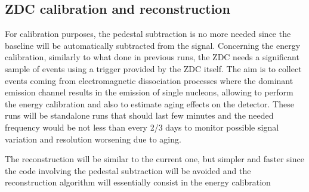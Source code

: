 \subsection{ZDC calibration and reconstruction}
\label{ZDC:FLP}

For calibration purposes, the pedestal subtraction is no more needed since 
the baseline will be automatically subtracted from the signal. 
Concerning the energy calibration, similarly to what done in previous runs, 
the ZDC needs a significant sample of events using a trigger provided by the ZDC itself. 
The aim is to collect events coming from electromagnetic dissociation processes where the 
dominant emission channel results in the emission of single nucleons, allowing to perform 
the energy calibration and also to estimate aging effects on the detector. 
These runs will be standalone runs that should last few minutes and the needed frequency 
would be not less than every 2/3 days to monitor possible signal variation and resolution 
worsening due to aging.

The reconstruction will be similar to the current one, but simpler and faster since the code 
involving the pedestal subtraction will be avoided and the reconstruction algorithm will 
essentially consist in the energy calibration 
